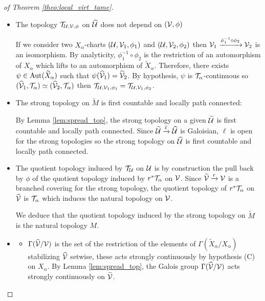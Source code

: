 \begin{proof}[of Theorem \ref{theo:local_virt_tame}]
 \begin{itemize}
   \item The topology $\mathcal{T}_{\mathcal{U},\mathcal V,\phi}$ on $\widehat {\mathcal{U}}$ does not depend on $(\mathcal V,\phi)$
   
   If we consider two $X_\alpha$-charts $(\mathcal{U},\mathcal V_1,\phi_1)$ and $(\mathcal{U},\mathcal V_2,\phi_2)$ then $ \mathcal V_1\xrightarrow{\phi_1^{-1}\circ \phi_2} \mathcal V_2$ is an isomorphism. By analyticity, $\phi_1^{-1}\circ \phi_2$ is the restriction of an automorphism of $X_\alpha$ which lifts to an automorphism of $\widetilde X_\alpha$. Therefore, there exists $\psi\in \mathrm{Aut}(\widetilde X_\alpha)$ such that $\psi(\widehat {\mathcal V}_1)= \widehat {\mathcal V}_2$. By hypothesis, $\psi$ is $\mathcal{T}_\alpha$-continuous so $(\widehat {\mathcal V}_1,\mathcal{T}_\alpha) \simeq (\widehat {\mathcal V}_2,\mathcal{T}_\alpha) $ then $\mathcal{T}_{\mathcal{U},\mathcal V_1,\phi_1}=\mathcal{T}_{\mathcal{U},\mathcal V_1,\phi_2}$.

  \item The strong topology on $\widetilde M$ is  first countable and locally path connected:
  
  By Lemma \ref{lem:spread_top}, the strong topology on a given $\widetilde {\mathcal{U}}$ is first countable and locally path connected.  Since $\widetilde {\mathcal{U}} \xrightarrow{\ell}\widehat {\mathcal{U}} $ is Galoisian, $\ell$ is open for the strong topologies so the strong topology on $\widehat {\mathcal{U}}$ is first countable and locally path connected.
  
 
  \item[(A)] The quotient topology induced by $\mathcal{T}_{\mathcal{U}}$ on $\mathcal{U}$ is by construction the pull back by $\phi$ of the quotient topology induced by $r^*\mathcal{T}_\alpha$ on $\mathcal V$. Since $\widetilde {\mathcal V}\xrightarrow{r} \mathcal V$ is a branched covering for the strong topology, the quotient topology of $r^*\mathcal{T}_\alpha$ on $\widehat {\mathcal V}$ is $\mathcal{T}_\alpha$ which induces the natural topology on $\mathcal V$.

We deduce that the quotient topology induced by the strong topology on $\widetilde M$ is the natural topology $M$.
 



\item[(B)] 
\begin{itemize}
\item $\Gamma(\widehat {\mathcal V}/\mathcal V)$ is the set of the restriction of the elements of $\Gamma(\widetilde X_\alpha/X_\alpha)$ stabilizing $\widehat {\mathcal V}$ setwise, these acts strongly continuously by hypothesis (C) on $X_\alpha$. By Lemma \ref{lem:spread_top}, the Galois group $\Gamma(\widehat {\mathcal V}/\mathcal V)$ acts strongly continuously  on $\widetilde {\mathcal V}$. 




\end{itemize}
\end{itemize}
\end{proof}
